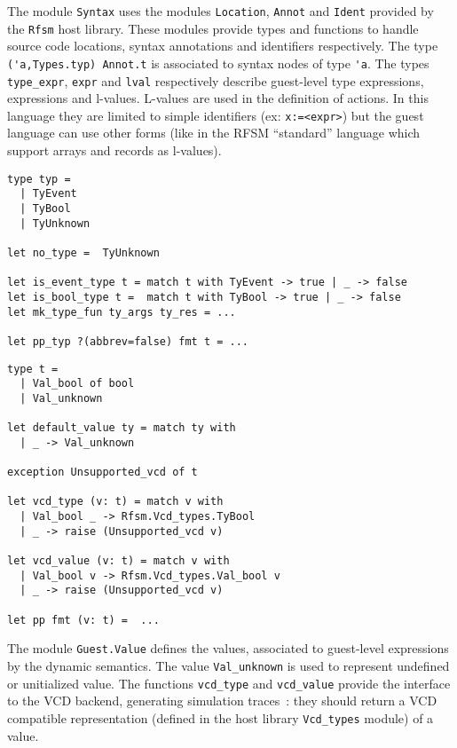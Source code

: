 The module \texttt{Syntax} uses the modules \texttt{Location}, \texttt{Annot}  and \texttt{Ident}
provided by the \texttt{Rfsm} host library. These modules provide types and functions to handle
source code locations, syntax annotations and identifiers respectively. The type
\verb|('a,Types.typ) Annot.t| is associated to syntax nodes of type
\verb|'a|. The types \verb|type_expr|, \verb|expr| and \verb|lval| respectively describe guest-level
type expressions, expressions and l-values. L-values are used in the definition of
actions. In this language they are limited to simple identifiers (ex: \verb|x:=<expr>|) but the
guest language can use other forms (like in the RFSM ``standard'' language which support arrays and
records as l-values). 

\begin{lstlisting}[language={[Objective]Caml},frame=single,basicstyle=\small,caption={Module
    \texttt{Guest.Values} (excerpt)},label={lst:mini-value}]
type typ =
  | TyEvent
  | TyBool
  | TyUnknown

let no_type =  TyUnknown

let is_event_type t = match t with TyEvent -> true | _ -> false
let is_bool_type t =  match t with TyBool -> true | _ -> false
let mk_type_fun ty_args ty_res = ...

let pp_typ ?(abbrev=false) fmt t = ...
\end{lstlisting}

\begin{lstlisting}[language={[Objective]Caml},frame=single,basicstyle=\small,caption={Module
    \texttt{Guest.Value} (excerpt)},label={lst:mini-value}]
type t =
  | Val_bool of bool
  | Val_unknown

let default_value ty = match ty with
  | _ -> Val_unknown

exception Unsupported_vcd of t

let vcd_type (v: t) = match v with
  | Val_bool _ -> Rfsm.Vcd_types.TyBool
  | _ -> raise (Unsupported_vcd v)

let vcd_value (v: t) = match v with
  | Val_bool v -> Rfsm.Vcd_types.Val_bool v
  | _ -> raise (Unsupported_vcd v)

let pp fmt (v: t) =  ...
\end{lstlisting}

The module \verb|Guest.Value| defines the values, associated to guest-level expressions by the
dynamic semantics. The value \verb|Val_unknown| is used to represent undefined or unitialized
value. The functions \verb|vcd_type| and \verb|vcd_value| provide the interface to the VCD backend,
generating simulation traces~: they should return a VCD compatible representation  (defined in the
host library \verb|Vcd_types| module) of a value.

